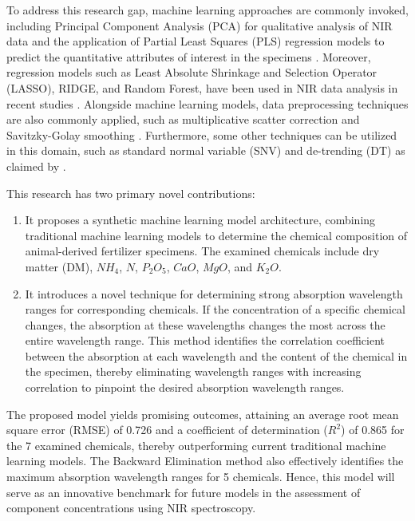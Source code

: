 \documentclass[10pt, a4paper, oneside]{article}
\begin{document}
To address this research gap, machine learning approaches are commonly invoked, including Principal Component Analysis (PCA) for qualitative analysis of NIR data and the application of Partial Least Squares (PLS) regression models to predict the quantitative attributes of interest in the specimens \cite{kumaravelu2015review}. Moreover, regression models such as Least Absolute Shrinkage and Selection Operator (LASSO), RIDGE, and Random Forest, have been used in NIR data analysis in recent studies \cite{horf2022optical}. Alongside machine learning models, data preprocessing techniques are also commonly applied, such as multiplicative scatter correction and Savitzky-Golay smoothing \cite{feng2022evaluation}. Furthermore, some other techniques can be utilized in this domain, such as standard normal variable (SNV) and de-trending (DT) as claimed by \cite{huang2008evaluation, devianti2022near, devianti2021organic}.

This research has two primary novel contributions:
\begin{enumerate}
    \item It proposes a synthetic machine learning model architecture, combining traditional machine learning models to determine the chemical composition of animal-derived fertilizer specimens. The examined chemicals include dry matter (DM), \(NH_4\), \(N\), \(P_2O_5\), \(CaO\), \(MgO\), and \(K_2O\).
    \item It introduces a novel technique for determining strong absorption wavelength ranges for corresponding chemicals. If the concentration of a specific chemical changes, the absorption at these wavelengths changes the most across the entire wavelength range. This method identifies the correlation coefficient between the absorption at each wavelength and the content of the chemical in the specimen, thereby eliminating wavelength ranges with increasing correlation to pinpoint the desired absorption wavelength ranges. 
\end{enumerate}

The proposed model yields promising outcomes, attaining an average root mean square error (RMSE) of 0.726 and a coefficient of determination (\(R^2\)) of 0.865 for the 7 examined chemicals, thereby outperforming current traditional machine learning models. The Backward Elimination method also effectively identifies the maximum absorption wavelength ranges for 5 chemicals. Hence, this model will serve as an innovative benchmark for future models in the assessment of component concentrations using NIR spectroscopy.
\end{document}
